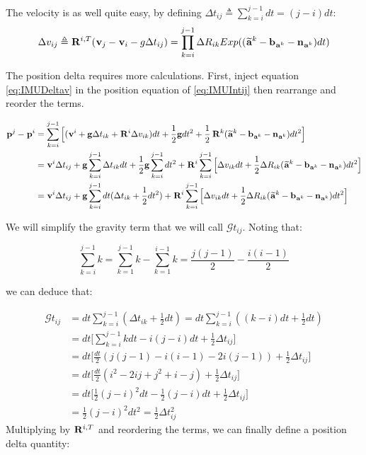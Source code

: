 \documentclass[11pt]{article}
\newcommand{\Rot}[2]{\prescript{#1}{}{\bfR}_{#2}}
\newcommand{\noise}{\bfn}
\newcommand{\bias}{\bfb}
\newcommand{\posi}[2]{\prescript{#1}{}{\bfp}_{#2}}
\newcommand{\vel}[2]{\prescript{#1}{}{\bfv}_{#2}}
\newcommand{\acc}[2]{\prescript{#1}{}{\bfa}_{#2}}
\newcommand{\accm}[2]{\prescript{#1}{}{\widetilde{\bfa}}_{#2}}
\newcommand{\grav}{\bfg}
\begin{document}
The velocity is as well quite easy, by defining $\Delta t_{ij} \triangleq \sum_{k=i}^{j-1} dt = (j-i)dt$:
\begin{equation}
    \Delta v_{ij} \triangleq \Rot{}{}^{i,T} (\vel{}{j} - \vel{}{i} - g \Delta t_{ij}) 
    = \prod_{k=i}^{j-1} \Delta R_{ik} Exp((\accm{}{}^k - \bias_{\acc{}{}^k} - \noise_{\acc{}{}^k})dt)
    \label{eq:IMUDeltav}
\end{equation}

The position delta requires more calculations. First, inject equation \ref{eq:IMUDeltav} in the position equation of \ref{eq:IMUIntij} then rearrange and reorder the terms.

\begin{equation}
\begin{split}
\posi{}{}^{j} - \posi{}{}^{i} &= \sum_{k=i}^{j-1} \Big[
(\vel{}{}^i + \grav \Delta t_{ik} + \Rot{}{}^i \Delta v_{ik})dt 
+ \frac{1}{2}\grav dt^2 + \frac{1}{2}\Rot{}{}^{k}(\accm{}{}^k - \bias_{\acc{}{}^k} - \noise_{\acc{}{}^k})dt^2 \Big]
\\
&= \vel{}{}^i \Delta t_{ij} + 
\grav\sum_{k=i}^{j-1} \Delta t_{ik} dt + \frac{1}{2}\grav \sum_{k=i}^{j-1} dt^2 +
\Rot{}{}^i\sum_{k=i}^{j-1} \Big[\Delta v_{ik}dt +  \frac{1}{2} \Delta R_{ik} (\accm{}{}^k - \bias_{\acc{}{}^k} - \noise_{\acc{}{}^k})dt^2 \Big]
\\
&= \vel{}{}^i \Delta t_{ij} + 
\grav \sum_{k=i}^{j-1}dt (\Delta t_{ik} + \frac{1}{2}dt^2) +
\Rot{}{}^i\sum_{k=i}^{j-1} \Big[\Delta v_{ik}dt +  \frac{1}{2} \Delta R_{ik} (\accm{}{}^k - \bias_{\acc{}{}^k} - \noise_{\acc{}{}^k})dt^2 \Big]
\end{split}
\end{equation}

We will simplify the gravity term that we will call $\mathcal{G}t_{ij}$. Noting that:

\begin{equation*}
    \sum_{k=i}^{j-1}k = \sum_{k=1}^{j-1}k - \sum_{k=1}^{i-1}k = \frac{j(j-1)}{2} - \frac{i(i-1)}{2} 
\end{equation*}

we can deduce that:

\begin{equation*}
\begin{split}
\mathcal{G}t_{ij} 
&= dt \sum_{k=i}^{j-1}(\Delta t_{ik} + \frac{1}{2}dt) = dt \sum_{k=i}^{j-1}((k -i)dt + \frac{1}{2}dt)
\\
&= dt \Big[ \sum_{k=i}^{j-1} k dt - i(j-i)dt + \frac{1}{2}\Delta t_{ij}  \Big] 
\\
&= dt \Big[ \frac{dt}{2} (j(j-1) - i(i-1) - 2i(j-1)) + \frac{1}{2}\Delta t_{ij} \Big] 
\\
&= dt \Big[ \frac{dt}{2} (i^2 - 2ij + j^2 + i - j) + \frac{1}{2}\Delta t_{ij} \Big] 
\\
&= dt \Big[ \frac{1}{2} (j-i)^2dt - \frac{1}{2}(j - i)dt + \frac{1}{2}\Delta t_{ij} \Big]
\\
&= \frac{1}{2} (j-i)^2dt^2 = \frac{1}{2} \Delta t_{ij}^2
\end{split}
\end{equation*}
Multiplying by $\Rot{}{}^{i,T}$ and reordering the terms, we can finally define a position delta quantity:
\end{document}
